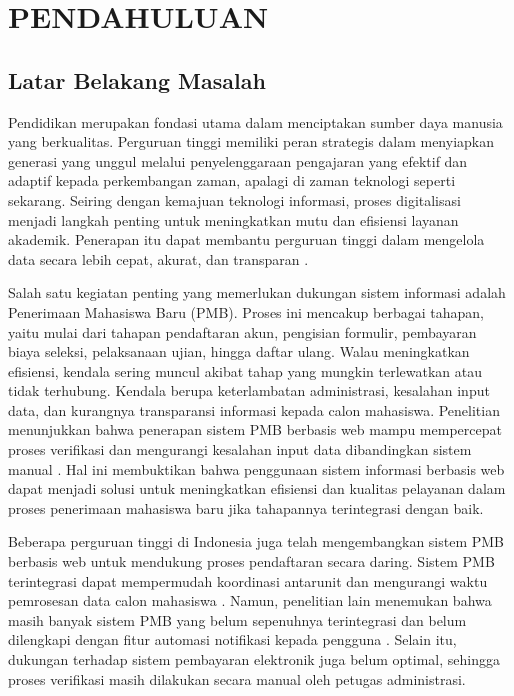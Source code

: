 \newpage
\chapter{PENDAHULUAN} \label{Bab I}

\section{Latar Belakang Masalah} \label{I.Latar Belakang}
Pendidikan merupakan fondasi utama dalam menciptakan sumber daya manusia yang berkualitas. Perguruan tinggi memiliki peran strategis dalam menyiapkan generasi yang unggul melalui penyelenggaraan pengajaran yang efektif dan adaptif kepada perkembangan zaman, apalagi di zaman teknologi seperti sekarang. Seiring dengan kemajuan teknologi informasi, proses digitalisasi menjadi langkah penting untuk meningkatkan mutu dan efisiensi layanan akademik. Penerapan itu dapat membantu perguruan tinggi dalam mengelola data secara lebih cepat, akurat, dan transparan \cite{lubis2021pendidikan}.\par

Salah satu kegiatan penting yang memerlukan dukungan sistem informasi adalah Penerimaan Mahasiswa Baru (PMB). Proses ini mencakup berbagai tahapan, yaitu mulai dari tahapan pendaftaran akun, pengisian formulir, pembayaran biaya seleksi, pelaksanaan ujian, hingga daftar ulang. Walau meningkatkan efisiensi, kendala sering muncul akibat tahap yang mungkin terlewatkan atau tidak terhubung. Kendala berupa keterlambatan administrasi, kesalahan input data, dan kurangnya transparansi informasi kepada calon mahasiswa. Penelitian menunjukkan bahwa penerapan sistem PMB berbasis web mampu mempercepat proses verifikasi dan mengurangi kesalahan input data dibandingkan sistem manual \cite{ilham2024sistem}. Hal ini membuktikan bahwa penggunaan sistem informasi berbasis web dapat menjadi solusi untuk meningkatkan efisiensi dan kualitas pelayanan dalam proses penerimaan mahasiswa baru jika tahapannya terintegrasi dengan baik.\par

Beberapa perguruan tinggi di Indonesia juga telah mengembangkan sistem PMB berbasis web untuk mendukung proses pendaftaran secara daring. Sistem PMB terintegrasi dapat mempermudah koordinasi antarunit dan mengurangi waktu pemrosesan data calon mahasiswa \cite{hidayat2024pengembangan}. Namun, penelitian lain menemukan bahwa masih banyak sistem PMB yang belum sepenuhnya terintegrasi dan belum dilengkapi dengan fitur automasi notifikasi kepada pengguna \cite{akbar2023sistem}. Selain itu, dukungan terhadap sistem pembayaran elektronik juga belum optimal, sehingga proses verifikasi masih dilakukan secara manual oleh petugas administrasi.\par

